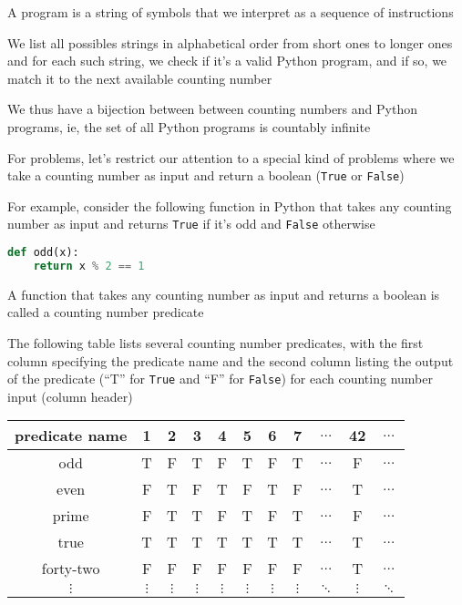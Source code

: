 \documentclass[8pt,a4paper,compress]{beamer}
\begin{document}
\begin{frame}[fragile]
\pause

A program is a string of symbols that we interpret as a sequence of instructions

\pause
\bigskip

We list all possibles strings in alphabetical order from short ones to longer ones and for each such string, we check if it's a valid Python program, and if so, we match it to the next available counting number

\pause
\bigskip

We thus have a bijection between between counting numbers and Python programs, ie, the set of all Python programs is countably infinite
\end{frame}

\begin{frame}[fragile]
\pause

For problems, let's restrict our attention to a special kind of problems where we take a counting number as input and return a boolean (\lstinline{True} or \lstinline{False})

\pause
\bigskip

For example, consider the following function in Python that takes any counting number as input and returns \lstinline{True} if it's odd and \lstinline{False} otherwise

\begin{lstlisting}[language=Python]
def odd(x):
    return x % 2 == 1
\end{lstlisting}

\pause
\bigskip

A function that takes any counting number as input and returns a boolean is called a counting number predicate

\pause
\bigskip

The following table lists several counting number predicates, with the first column specifying the predicate name and the second column listing the output of the predicate (``T'' for \lstinline{True} and ``F'' for \lstinline{False}) for each counting number input (column header)
\begin{center}
\begin{tabular}{c|cccccccccc}
predicate name & 1 & 2 & 3 & 4 & 5 & 6 & 7 & $\dots$ & 42 & $\dots$ \\ \hline
odd            & T & F & T & F & T & F & T & $\dots$ & F  & $\dots$ \\ 
even           & F & T & F & T & F & T & F & $\dots$ & T  & $\dots$ \\
prime          & F & T & T & F & T & F & T & $\dots$ & F  & $\dots$ \\
true           & T & T & T & T & T & T & T & $\dots$ & T  & $\dots$ \\
forty-two      & F & F & F & F & F & F & F & $\dots$ & T  & $\dots$ \\
$\vdots$       & $\vdots$ & $\vdots$ & $\vdots$ & $\vdots$ & $\vdots$& $\vdots$ & $\vdots$ & $\ddots$ & $\vdots$ & $\ddots$
\end{tabular}
\end{center}
\end{frame}
\end{document}
